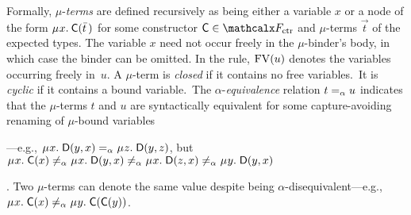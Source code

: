 Formally, $\mu$-\emph{terms} are defined recursively as being either a variable $x$
or a node of the form
$\MU x.\: \const{C}( \vec t\, )$ for some constructor $\const{C} \in \Ctr$ and
$\mu$-terms $\vec t$ of the expected types.
The variable $x$ need not occur freely in the $\mu$-binder's body, in which case
the binder can be omitted.
In the  rule,
$\mathrm{FV}( u )$ denotes the variables occurring freely in~$u$.
%
%
%
A $\mu$-term is \emph{closed} if %
it contains no free variables. \,It is \emph{cyclic} if %
it contains a bound variable. \,The
\goodbreak %
\noindent
$\alpha$-\emph{equivalence} relation $t \mathrel{=_\alpha} u$
indicates that the $\mu$-terms $t$ and $u$
are syntactically equivalent for some capture-avoiding renaming of $\mu$-bound variables\begin{rep}---e.g.,
$\MU x.\; \const{D}( y, x ) \aequiv \MU z.\; \const{D}( y, z )$,
but
$\MU x.\; \const{C}( x ) \not\aequiv \MU x.\; \const{D}( y, x ) \not\aequiv \MU x.\; \const{D}( z, x )
\not\aequiv \MU y.\; \const{D}( y, x )$\end{rep}.
Two $\mu$-terms can denote the same value despite being $\alpha$-disequivalent---e.g.,
$\MU x.\; \const{C}( x ) \not\aequiv \MU y.\; \const{C}( \const{C}( y ) )$.

